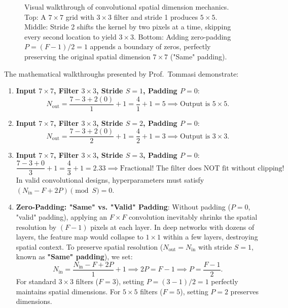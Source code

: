 \begin{figure}[H]
\caption{Visual walkthrough of convolutional spatial dimension mechanics. Top: A $7 \times 7$ grid with $3 \times 3$ filter and stride 1 produces $5 \times 5$. Middle: Stride 2 shifts the kernel by two pixels at a time, skipping every second location to yield $3 \times 3$. Bottom: Adding zero-padding $P = (F-1)/2 = 1$ appends a boundary of zeros, perfectly preserving the original spatial dimension $7 \times 7$ ("Same" padding).}
\label{fig:conv_hyperparameter_walkthrough}
\end{figure}

The mathematical walkthroughs presented by Prof.~Tommasi demonstrate:
\begin{enumerate}
  \item \textbf{Input $7 \times 7$, Filter $3 \times 3$, Stride $S=1$, Padding $P=0$}:
    \begin{equation}
    N_{\text{out}} = \frac{7 - 3 + 2(0)}{1} + 1 = \frac{4}{1} + 1 = 5 \implies \text{Output is } 5 \times 5.
    \end{equation}
  \item \textbf{Input $7 \times 7$, Filter $3 \times 3$, Stride $S=2$, Padding $P=0$}:
    \begin{equation}
    N_{\text{out}} = \frac{7 - 3 + 2(0)}{2} + 1 = \frac{4}{2} + 1 = 3 \implies \text{Output is } 3 \times 3.
    \end{equation}
  \item \textbf{Input $7 \times 7$, Filter $3 \times 3$, Stride $S=3$, Padding $P=0$}:
    \begin{equation}
    \frac{7 - 3 + 0}{3} + 1 = \frac{4}{3} + 1 = 2.33 \implies \text{Fractional! The filter does NOT fit without clipping!}
    \end{equation}
    In valid convolutional designs, hyperparameters must satisfy $(N_{\text{in}} - F + 2P) \pmod S = 0$.
  \item \textbf{Zero-Padding: "Same" vs. "Valid" Padding}:
    Without padding ($P = 0$, "valid" padding), applying an $F \times F$ convolution inevitably shrinks the spatial resolution by $(F - 1)$ pixels at each layer. In deep networks with dozens of layers, the feature map would collapse to $1 \times 1$ within a few layers, destroying spatial context.
    To preserve spatial resolution ($N_{\text{out}} = N_{\text{in}}$ with stride $S = 1$, known as \textbf{"Same" padding}), we set:
    \begin{equation}
    N_{\text{in}} = \frac{N_{\text{in}} - F + 2P}{1} + 1 \implies 2P = F - 1 \implies P = \frac{F - 1}{2}.
    \label{eq:same_padding_formula}
    \end{equation}
    For standard $3 \times 3$ filters ($F = 3$), setting $P = (3-1)/2 = 1$ perfectly maintains spatial dimensions. For $5 \times 5$ filters ($F = 5$), setting $P = 2$ preserves dimensions.
\end{enumerate}

